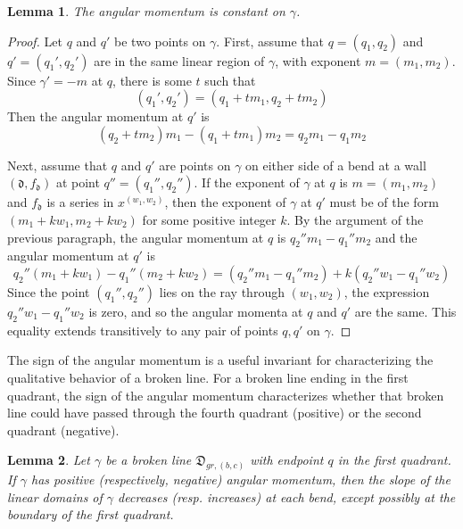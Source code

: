 \documentclass[10pt]{amsart}
\newtheorem{lemma}{Lemma}[section]
\theoremstyle{remark}
\numberwithin{equation}{section}
\newcommand{\fd}{\mathfrak{d}}
\begin{document}
\begin{lemma}
The angular momentum is constant on $\gamma$.
\end{lemma}
\begin{proof}
Let $q$ and $q'$ be two points on $\gamma$.
First, assume that $q=(q_1,q_2)$ and $q'=(q_1',q_2')$ are in the same linear region of $\gamma$, with exponent $m=(m_1,m_2)$.  Since $\gamma'=-m$ at $q$, there is some $t$ such that 
\[ (q_1',q_2') = (q_1+tm_1,q_2+tm_2) \]
Then the angular momentum at $q'$ is 
\[ (q_2+tm_2)m_1-(q_1+tm_1)m_2 = q_2m_1 - q_1m_2 \]

Next, assume that $q$ and $q'$ are points on $\gamma$ on either side of a bend at a wall $(\fd, f_{\fd})$ at point $q''=(q_1'',q_2'')$.  If the exponent of $\gamma$ at $q$ is $m=(m_1,m_2)$ and $f_{\fd}$ is a series in $x^{(w_1,w_2)}$, then the exponent of $\gamma$ at $q'$ must be of the form $(m_1+kw_1,m_2+kw_2)$ for some positive integer $k$.  By the argument of the previous paragraph, the angular momentum at $q$ is $q_2''m_1-q_1''m_2$
and the angular momentum at $q'$ is
\[ q_2''(m_1+kw_1)-q_1''(m_2+kw_2) = (q_2''m_1-q_1''m_2)+k(q_2''w_1-q_1''w_2) \]
Since the point $(q_1'',q_2'')$ lies on the ray through $(w_1,w_2)$, the expression $q_2''w_1-q_1''w_2$ is zero, and so the angular momenta at $q$ and $q'$ are the same.  This equality extends transitively to any pair of points $q,q'$ on $\gamma$.
\end{proof}
The sign of the angular momentum is a useful invariant for characterizing the qualitative behavior of a broken line.
For a broken line ending in the first quadrant, the sign of the angular momentum characterizes whether that broken line could have passed through the fourth quadrant (positive) or the second quadrant (negative).

\begin{lemma}
Let $\gamma$ be a broken line $\mathfrak{D}_{gr,(b,c)}$ with endpoint $q$ in the first quadrant. If $\gamma$ has positive (respectively, negative) angular momentum, then the slope of the linear domains of $\gamma$ decreases (resp. increases) at each bend, except possibly at the boundary of the first quadrant. 
\end{lemma}
\end{document}
